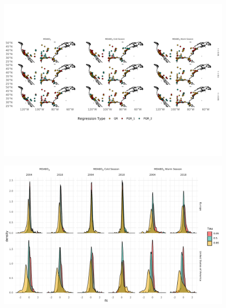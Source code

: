 \documentclass{article}
\begin{document}
\begin{figure}
\centering
\includegraphics[width=\linewidth]{figures/si_figures/fS04_regression_type_map_us.pdf}
\caption{}
\label{si_fig:reg_map}
\end{figure}
\clearpage


\begin{figure}
\centering
\includegraphics[width=\linewidth]{figures/si_figures/fS05_slope_density.pdf}
\caption{}
\label{si_fig:slope_density}
\end{figure}
\clearpage

\end{document}
